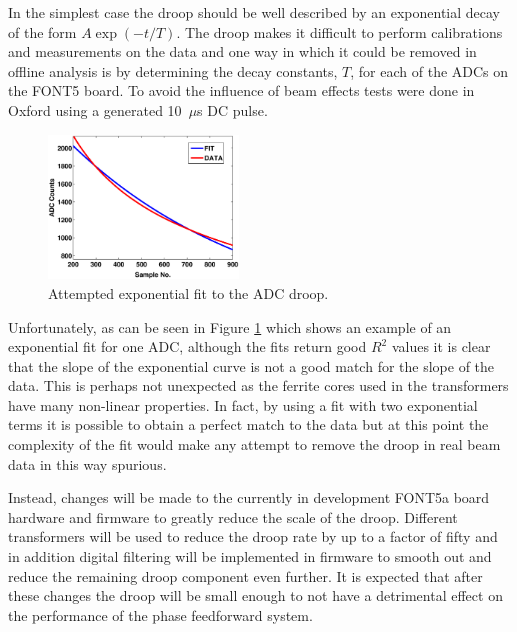 In the simplest case the droop should be well described by an exponential decay of the form \(A\exp\left(-t/T\right)\). The droop makes it difficult to perform calibrations and measurements on the data and one way in which it could be removed in offline analysis is by determining the decay constants, \(T\), for each of the ADCs on the FONT5 board. To avoid the influence of beam effects tests were done in Oxford using a generated 10~\(\mu\)s DC pulse.

\begin{figure}
  \centering
  \includegraphics[width=0.45\textwidth]{Figures/droopFit}
  \caption{Attempted exponential fit to the ADC droop.}
  \label{f:droopFit}
\end{figure}

Unfortunately, as can be seen in Figure \ref{f:droopFit} which shows an example of an exponential fit for one ADC, although the fits return good \(R^{2}\) values it is clear that the slope of the exponential curve is not a good match for the slope of the data. This is perhaps not unexpected as the ferrite cores used in the transformers have many non-linear properties. In fact, by using a fit with two exponential terms it is possible to obtain a perfect match to the data but at this point the complexity of the fit would make any attempt to remove the droop in real beam data in this way spurious.

Instead, changes will be made to the currently in development FONT5a board hardware and firmware to greatly reduce the scale of the droop. Different transformers will be used to reduce the droop rate by up to a factor of fifty and in addition digital filtering will be implemented in firmware to smooth out and reduce the remaining droop component even further. It is expected that after these changes the droop will be small enough to not have a detrimental effect on the performance of the phase feedforward system. 




